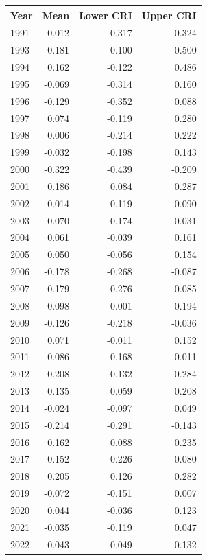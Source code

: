\documentclass[
]{book}
\begin{document}
\begin{tabular}[t]{l|r|r|r}
\hline
Year & Mean & Lower CRI & Upper CRI\\
\hline
1991 & 0.012 & -0.317 & 0.324\\
\hline
1993 & 0.181 & -0.100 & 0.500\\
\hline
1994 & 0.162 & -0.122 & 0.486\\
\hline
1995 & -0.069 & -0.314 & 0.160\\
\hline
1996 & -0.129 & -0.352 & 0.088\\
\hline
1997 & 0.074 & -0.119 & 0.280\\
\hline
1998 & 0.006 & -0.214 & 0.222\\
\hline
1999 & -0.032 & -0.198 & 0.143\\
\hline
2000 & -0.322 & -0.439 & -0.209\\
\hline
2001 & 0.186 & 0.084 & 0.287\\
\hline
2002 & -0.014 & -0.119 & 0.090\\
\hline
2003 & -0.070 & -0.174 & 0.031\\
\hline
2004 & 0.061 & -0.039 & 0.161\\
\hline
2005 & 0.050 & -0.056 & 0.154\\
\hline
2006 & -0.178 & -0.268 & -0.087\\
\hline
2007 & -0.179 & -0.276 & -0.085\\
\hline
2008 & 0.098 & -0.001 & 0.194\\
\hline
2009 & -0.126 & -0.218 & -0.036\\
\hline
2010 & 0.071 & -0.011 & 0.152\\
\hline
2011 & -0.086 & -0.168 & -0.011\\
\hline
2012 & 0.208 & 0.132 & 0.284\\
\hline
2013 & 0.135 & 0.059 & 0.208\\
\hline
2014 & -0.024 & -0.097 & 0.049\\
\hline
2015 & -0.214 & -0.291 & -0.143\\
\hline
2016 & 0.162 & 0.088 & 0.235\\
\hline
2017 & -0.152 & -0.226 & -0.080\\
\hline
2018 & 0.205 & 0.126 & 0.282\\
\hline
2019 & -0.072 & -0.151 & 0.007\\
\hline
2020 & 0.044 & -0.036 & 0.123\\
\hline
2021 & -0.035 & -0.119 & 0.047\\
\hline
2022 & 0.043 & -0.049 & 0.132\\
\hline
\end{tabular}
\end{document}
